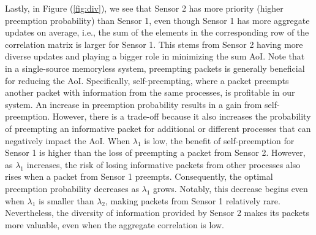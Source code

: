 Lastly, in Figure (\ref{fig:div}), we see that Sensor 2 has more priority (higher preemption probability) than Sensor 1, even though Sensor 1 has more aggregate updates on average, i.e., 
the sum of the elements in the corresponding row of the correlation matrix is larger for Sensor 1. This stems from Sensor 2 having more diverse updates and playing a bigger role in minimizing the sum AoI. Note that in a single-source memoryless system, preempting packets is generally beneficial for reducing the AoI. Specifically, self-preempting, where a packet preempts another packet with information from the same processes, is profitable in our system. An increase in preemption probability results in a gain from self-preemption. However, there is a trade-off because it also increases the probability of preempting an informative packet for additional or different processes that can negatively impact the AoI. When $\lambda_1$ is low, the benefit of self-preemption for Sensor 1 is higher than the loss of preempting a packet from Sensor 2. However, as $\lambda_1$ increases, the risk of losing informative packets from other processes also rises when a packet from Sensor 1 preempts. Consequently, the optimal preemption probability decreases as $\lambda_1$ grows. Notably, this decrease begins even when $\lambda_1$ is smaller than $\lambda_2$, making packets from Sensor 1 relatively rare. Nevertheless, the diversity of information provided by Sensor 2 makes its packets more valuable, even when the aggregate correlation is low.
\vspace{-12pt}



